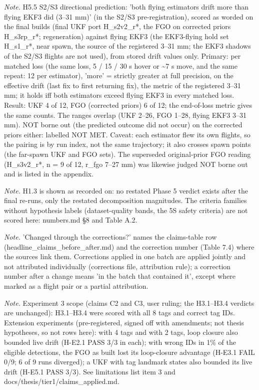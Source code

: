 \begin{table}[htbp]
\textit{Note.} H5.5 S2/S3 directional prediction: 'both flying estimators drift more than flying EKF3 did (3--31 mm)' (in the S2/S3 pre-registration), scored as worded on the final builds (final UKF port H\_s2v2\_r*, the FGO on corrected priors H\_s3rp\_r*; regeneration) against flying EKF3 (the EKF3-flying hold set H\_s1\_r*, near spawn, the source of the registered 3--31 mm; the EKF3 shadows of the S2/S3 flights are not used), from stored drift values only. Primary: per matched loss (the same loss, 5 / 15 / 30 s hover or \textasciitilde{}7 s move, and the same repeat: 12 per estimator), 'more' = strictly greater at full precision, on the effective drift (last fix to first returning fix), the metric of the registered 3--31 mm; it holds iff both estimators exceed flying EKF3 in every matched loss. Result: UKF 4 of 12, FGO (corrected priors) 6 of 12; the end-of-loss metric gives the same counts. The ranges overlap (UKF 2--26, FGO 1--28, flying EKF3 3--31 mm). NOT borne out (the predicted outcome did not occur) on the corrected priors either: labelled NOT MET. Caveat: each estimator flew its own flights, so the pairing is by run index, not the same trajectory; it also crosses spawn points (the far-spawn UKF and FGO sets). The superseded original-prior FGO reading (H\_s3v2\_r*, n = 9 of 12, r\_fgo 7--27 mm) was likewise judged NOT borne out and is listed in the appendix.\par
\textit{Note.} H1.3 is shown as recorded on: no restated Phase 5 verdict exists after the final re-runs, only the restated decomposition magnitudes. The criteria families without hypothesis labels (dataset-quality bands, the 5S safety criteria) are not scored here: numbers.md \S{}8 and Table A.2.\par
\textit{Note.} 'Changed through the corrections?' names the claims-table row (headline\_claims\_before\_after.md) and the correction number (Table 7.4) where the sources link them. Corrections applied in one batch are applied jointly and not attributed individually (corrections file, attribution rule); a correction number after a change means 'in the batch that contained it', except where marked as a flight pair or a partial attribution.\par
\textit{Note.} Experiment 3 scope (claims C2 and C3, user ruling; the H3.1--H3.4 verdicts are unchanged): H3.1--H3.4 were scored with all 8 tags and correct tag IDs. Extension experiments (pre-registered, signed off with amendments; not thesis hypotheses, so not rows here): with 4 tags and with 2 tags, loop closure also bounded live drift (H-E2.1 PASS 3/3 in each); with wrong IDs in 1\% of the eligible detections, the FGO as built lost its loop-closure advantage (H-E3.1 FAIL 0/9; 6 of 9 runs diverged); a UKF with tag landmark states also bounded its live drift (H-E5.1 PASS 3/3). See limitations list item 3 and docs/thesis/tier1/claims\_applied.md.\par
\end{table}

